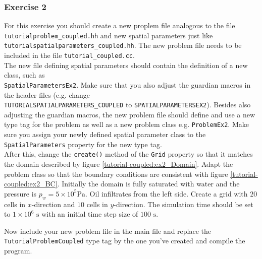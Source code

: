 \subsubsection{Exercise 2}
For this exercise you should create a new proplem file analogous to
the file \texttt{tutorialproblem\_coupled.hh} and new spatial parameters 
just like \texttt{tutorialspatialparameters\_coupled.hh}. The new problem file needs to
be included in the file \texttt{tutorial\_coupled.cc}.  \\
The new file defining spatial parameters should contain the definition 
of a new class, such as \\
\texttt{SpatialParametersEx2}. Make sure that you also adjust the guardian
macros in the header files (e.g. change \\
\texttt{TUTORIALSPATIALPARAMETERS\_COUPLED} to
\texttt{SPATIALPARAMETERSEX2}). Besides also adjusting the guardian macros, 
the new problem file should define and use a new type tag for the problem as well as a new problem class
e.g. \texttt{ProblemEx2}. Make sure you assign your newly defined spatial 
parameter class to the \texttt{SpatialParameters} property for the new 
type tag. \\
After this, change the \texttt{create()} method of the \texttt{Grid}
property so that it matches the domain described
by figure \ref{tutorial-coupled:ex2_Domain}. Adapt the problem class
so that the boundary conditions are consistent with figure
\ref{tutorial-coupled:ex2_BC}. Initially the domain is fully saturated
with water and the pressure is $p_w = 5 \times 10^5 \text{Pa}$. Oil
infiltrates from the left side. Create a grid with $20$ cells in
$x$-direction and $10$ cells in $y$-direction. The simulation time
should be set to $1\times 10^6 \text{ s}$ with an initial time step size of
$100 \text{ s}$.

Now include your new problem file in the main file and replace the
\texttt{TutorialProblemCoupled} type tag by the one you've created and
compile the program.


